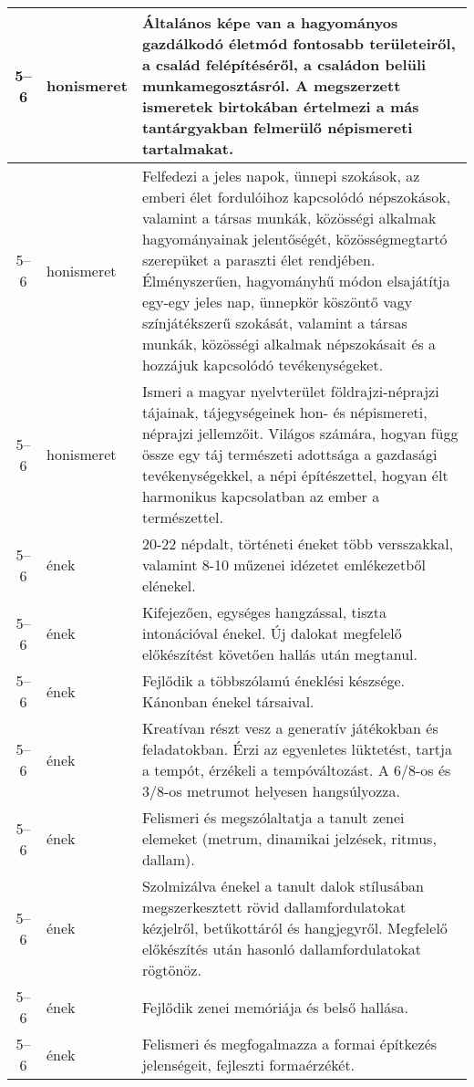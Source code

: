 \begin{small}
\begin{longtable}{c | p{2cm} |  p{11cm} }
              5--6 & honismeret & Általános képe van a hagyományos gazdálkodó életmód fontosabb területeiről, a család felépítéséről, a családon belüli munkamegosztásról. A megszerzett ismeretek birtokában értelmezi a más tantárgyakban felmerülő népismereti tartalmakat. \\ \hline
              5--6 & honismeret & Felfedezi a jeles napok, ünnepi szokások, az emberi élet fordulóihoz kapcsolódó népszokások, valamint a társas munkák, közösségi alkalmak hagyományainak jelentőségét, közösségmegtartó szerepüket a paraszti élet rendjében. Élményszerűen, hagyományhű módon elsajátítja egy-egy jeles nap, ünnepkör köszöntő vagy színjátékszerű szokását, valamint a társas munkák, közösségi alkalmak népszokásait és a hozzájuk kapcsolódó tevékenységeket. \\ \hline
              5--6 & honismeret & Ismeri a magyar nyelvterület földrajzi-néprajzi tájainak, tájegységeinek hon- és népismereti, néprajzi jellemzőit. Világos számára, hogyan függ össze egy táj természeti adottsága a gazdasági tevékenységekkel, a népi építészettel, hogyan élt harmonikus kapcsolatban az ember a természettel. \\ \hline
              5--6 & ének & 20-22 népdalt, történeti éneket több versszakkal, valamint 8-10 műzenei idézetet emlékezetből elénekel. \\ \hline
              5--6 & ének & Kifejezően, egységes hangzással, tiszta intonációval énekel. Új dalokat megfelelő előkészítést követően hallás után megtanul. \\ \hline
              5--6 & ének & Fejlődik a többszólamú éneklési készsége. Kánonban énekel társaival. \\ \hline
              5--6 & ének & Kreatívan részt vesz a generatív játékokban és feladatokban. Érzi az egyenletes lüktetést, tartja a tempót, érzékeli a tempóváltozást. A 6/8-os és 3/8-os metrumot helyesen hangsúlyozza. \\ \hline
              5--6 & ének & Felismeri és megszólaltatja a tanult zenei elemeket (metrum, dinamikai jelzések, ritmus, dallam). \\ \hline
              5--6 & ének & Szolmizálva énekel a tanult dalok stílusában megszerkesztett rövid dallamfordulatokat kézjelről, betűkottáról és hangjegyről. Megfelelő előkészítés után hasonló dallamfordulatokat rögtönöz. \\ \hline
              5--6 & ének & Fejlődik zenei memóriája és belső hallása. \\ \hline
              5--6 & ének & Felismeri és megfogalmazza a formai építkezés jelenségeit, fejleszti formaérzékét. \\ \hline

\end{longtable}
\end{small}
